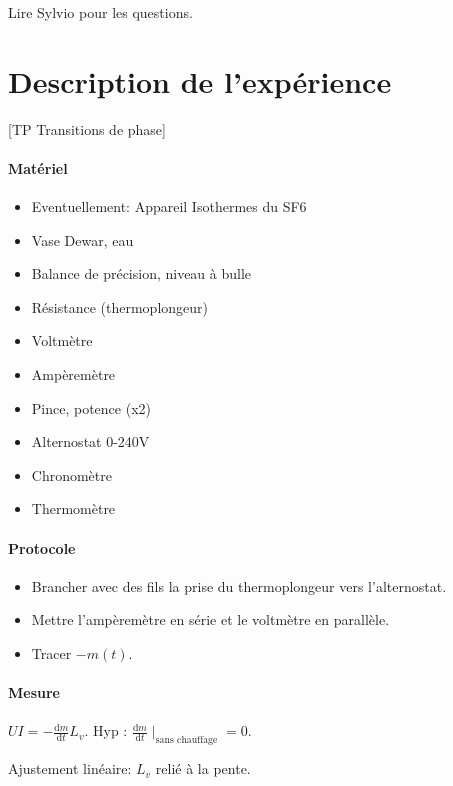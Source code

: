 \documentclass[11pt]{report}
\numberwithin{figure}{section}
\numberwithin{equation}{section}
\numberwithin{table}{section}
\newcommand{\ud}{\mathrm{d}}
\newcommand{\1}{\boldsymbol{1}}
\begin{document}
Lire Sylvio pour les questions.


\section*{Description de l'expérience}

[TP Transitions de phase]

\begin{tcolorbox}[breakable, enhanced, colback=red!2!white,colframe=mycolor!85!black,title=\textbf{\textbf{Expérience}}]

\paragraph*{Matériel} 
\begin{itemize}
\item Eventuellement: Appareil Isothermes du SF6
\item Vase Dewar, eau
\item Balance de précision, niveau à bulle
\item Résistance (thermoplongeur)
\item Voltmètre
\item Ampèremètre
\item Pince, potence (x2)
\item Alternostat 0-240V
\item Chronomètre
\item Thermomètre
\end{itemize}


\paragraph*{Protocole}
\begin{itemize}
\item Brancher avec des fils la prise du thermoplongeur vers l'alternostat.
\item Mettre l'ampèremètre en série et le voltmètre en parallèle.
\item Tracer $-m(t)$. 
\end{itemize} 

\paragraph*{Mesure}

$UI = - \frac{\ud m}{\ud t} L_v$. Hyp : $\frac{\ud m}{\ud t}\mid_{\text{sans chauffage}} = 0$. 

Ajustement linéaire: $L_v$ relié à la pente.

\end{tcolorbox}
\end{document}
